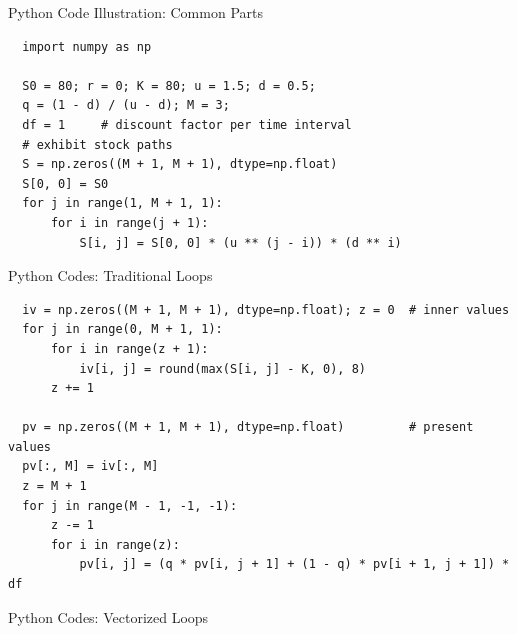 \documentclass[10pt,handout]{beamer}
\theoremstyle{definition}
\begin{document}
\begin{frame}[fragile]{Python Code Illustration: Common Parts}
  \begin{verbatim}
  import numpy as np
  
  S0 = 80; r = 0; K = 80; u = 1.5; d = 0.5; 
  q = (1 - d) / (u - d); M = 3; 
  df = 1     # discount factor per time interval
  # exhibit stock paths
  S = np.zeros((M + 1, M + 1), dtype=np.float)  
  S[0, 0] = S0
  for j in range(1, M + 1, 1):
      for i in range(j + 1):
          S[i, j] = S[0, 0] * (u ** (j - i)) * (d ** i)
  \end{verbatim}
\end{frame}
  
\begin{frame}[fragile]{Python Codes: Traditional Loops}
  \begin{verbatim}
  iv = np.zeros((M + 1, M + 1), dtype=np.float); z = 0  # inner values
  for j in range(0, M + 1, 1):
      for i in range(z + 1):
          iv[i, j] = round(max(S[i, j] - K, 0), 8)
      z += 1
  
  pv = np.zeros((M + 1, M + 1), dtype=np.float)         # present values
  pv[:, M] = iv[:, M]
  z = M + 1
  for j in range(M - 1, -1, -1):
      z -= 1
      for i in range(z):
          pv[i, j] = (q * pv[i, j + 1] + (1 - q) * pv[i + 1, j + 1]) * df
  \end{verbatim}
\end{frame}

\begin{frame}{Python Codes: Vectorized Loops}
  \inputminted[fontsize=\footnotesize,linenos=true]{python}{fig/note08/binomial_vec.py}
\end{frame}

%  
%  
\end{document}
